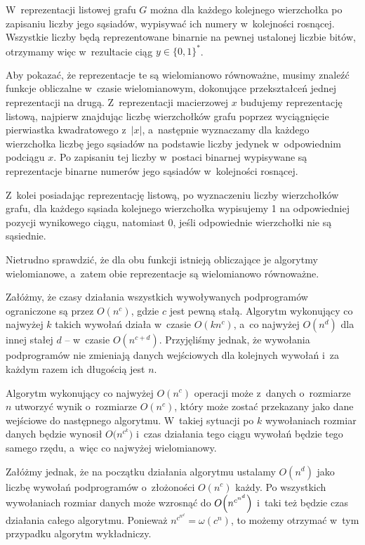 W~reprezentacji listowej grafu $G$ można dla każdego kolejnego wierzchołka po zapisaniu liczby jego sąsiadów, wypisywać ich numery w~kolejności rosnącej.
Wszystkie liczby będą reprezentowane binarnie na pewnej ustalonej liczbie bitów, otrzymamy więc w~rezultacie ciąg $y\in\{0,1\}^*$.

Aby pokazać, że reprezentacje te są wielomianowo równoważne, musimy znaleźć funkcje obliczalne w~czasie wielomianowym, dokonujące przekształceń jednej reprezentacji na drugą.
Z~reprezentacji macierzowej $x$ budujemy reprezentację listową, najpierw znajdując liczbę wierzchołków grafu poprzez wyciągnięcie pierwiastka kwadratowego z~$|x|$, a~następnie wyznaczamy dla każdego wierzchołka liczbę jego sąsiadów na podstawie liczby jedynek w~odpowiednim podciągu $x$.
Po zapisaniu tej liczby w~postaci binarnej wypisywane są reprezentacje binarne numerów jego sąsiadów w~kolejności rosnącej.

Z~kolei posiadając reprezentację listową, po wyznaczeniu liczby wierzchołków grafu, dla każdego sąsiada kolejnego wierzchołka wypisujemy 1 na odpowiedniej pozycji wynikowego ciągu, natomiast 0, jeśli odpowiednie wierzchołki nie są sąsiednie.

Nietrudno sprawdzić, że dla obu funkcji istnieją obliczające je algorytmy wielomianowe, a~zatem obie reprezentacje są wielomianowo równoważne.

\exercise %
\exercise %
Załóżmy, że czasy działania wszystkich wywoływanych podprogramów ograniczone są przez $O(n^c)$, gdzie $c$ jest pewną stałą.
Algorytm wykonujący co najwyżej $k$ takich wywołań działa w~czasie $O(kn^c)$, a~co najwyżej $O(n^d)$ dla innej stałej $d$ -- w~czasie $O(n^{c+d})$.
Przyjęliśmy jednak, że wywołania podprogramów nie zmieniają danych wejściowych dla kolejnych wywołań i~za każdym razem ich długością jest $n$.

Algorytm wykonujący co najwyżej $O(n^c)$ operacji może z~danych o~rozmiarze $n$ utworzyć wynik o~rozmiarze $O(n^c)$, który może zostać przekazany jako dane wejściowe do następnego algorytmu.
W~takiej sytuacji po $k$ wywołaniach rozmiar danych będzie wynosił $O\bigl(n^{c^k}\bigr)$ i~czas działania tego ciągu wywołań będzie tego samego rzędu, a~więc co najwyżej wielomianowy.

Załóżmy jednak, że na początku działania algorytmu ustalamy $O(n^d)$ jako liczbę wywołań podprogramów o~złożoności $O(n^c)$ każdy.
Po wszystkich wywołaniach rozmiar danych może wzrosnąć do $O\Bigl(n^{c^{n^d}}\Bigr)$ i~taki też będzie czas działania całego algorytmu.
Ponieważ $n^{c^{n^d}}\!\!=\omega(c^n)$, to możemy otrzymać w~tym przypadku algorytm wykładniczy.


